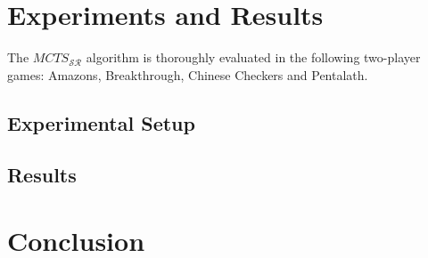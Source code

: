 \documentclass{kecsmstr}
\newcommand{\mctssr}{MCTS_{\mathcal{S}\mathcal{R}}}
\begin{document}
\chapter{Experiments and Results}
\label{chap:experiments}
\begin{chaptercontents}
The $\mctssr$ algorithm is thoroughly evaluated in the following two-player games: Amazons, Breakthrough, Chinese Checkers and Pentalath.
\end{chaptercontents}
\section{Experimental Setup}

\section{Results}

\chapter{Conclusion}
\label{chap:conclusion}

 \emptypage

\appendix



 \emptypage

\end{document}
